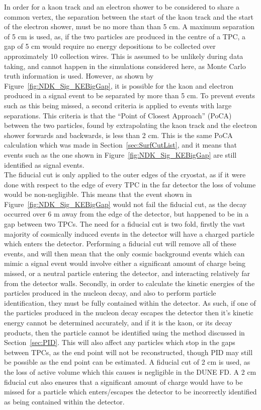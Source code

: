 In order for a kaon track and an electron shower to be considered to share a common vertex, the separation between the start of the kaon track and the start of the electron shower, must be no more than than 5 cm. A maximum separation of 5 cm is used, as, if the two particles are produced in the centre of a TPC, a gap of 5 cm would require no energy depositions to be collected over approximately 10 collection wires. This is assumed to be unlikely during data taking, and cannot happen in the simulations considered here, as Monte Carlo truth information is used. However, as shown by Figure~\ref{fig:NDK_Sig_KEBigGap}, it is possible for the kaon and electron produced in a signal event to be separated by more than 5 cm. To prevent events such as this being missed, a second criteria is applied to events with large separations. This criteria is that the ``Point of Closest Approach'' (PoCA) between the two particles, found by extrapolating the kaon track and the electron shower forwards and backwards, is less than 2 cm. This is the same PoCA calculation which was made in Section~\ref{sec:SurfCutList}, and it means that events such as the one shown in Figure~\ref{fig:NDK_Sig_KEBigGap} are still identified as signal events. \\

The fiducial cut is only applied to the outer edges of the cryostat, as if it were done with respect to the edge of every TPC in the far detector the loss of volume would be non-negligible. This means that the event shown in Figure~\ref{fig:NDK_Sig_KEBigGap} would not fail the fiducial cut, as the decay occurred over 6 m away from the edge of the detector, but happened to be in a gap between two TPCs. The need for a fiducial cut is two fold, firstly the vast majority of cosmically induced events in the detector will have a charged particle which enters the detector. Performing a fiducial cut will remove all of these events, and will then mean that the only cosmic background events which can mimic a signal event would involve either a significant amount of charge being missed, or a neutral particle entering the detector, and interacting relatively far from the detector walls. Secondly, in order to calculate the kinetic energies of the particles produced in the nucleon decay, and also to perform particle identification, they must be fully contained within the detector. As such, if one of the particles produced in the nucleon decay escapes the detector then it's kinetic energy cannot be determined accurately, and if it is the kaon, or its decay products, then the particle cannot be identified using the method discussed in Section~\ref{sec:PID}. This will also affect any particles which stop in the gaps between TPCs, as the end point will not be reconstructed, though PID may still be possible as the end point can be estimated. A fiducial cut of 2 cm is used, as the loss of active volume which this causes is negligible in the DUNE FD. A 2 cm fiducial cut also ensures that a significant amount of charge would have to be missed for a particle which enters/escapes the detector to be incorrectly identified as being contained within the detector. \\

